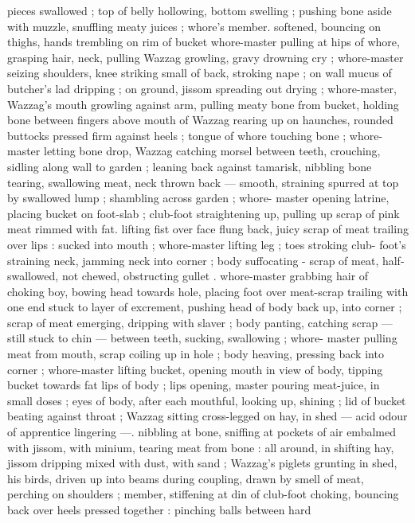 {pieces swallowed ; top of belly hollowing, bottom swelling ; pushing 
bone aside with muzzle, snuffling meaty juices ; whore's member. 
softened, bouncing on thighs, hands trembling on rim of bucket 
whore-master pulling at hips of whore, grasping hair, neck, pulling 
Wazzag growling, gravy drowning cry ; whore-master seizing 
shoulders, knee striking small of back, stroking nape ; on wall 
mucus of butcher's lad dripping ; on ground, jissom spreading out 
drying ; whore-master, Wazzag's mouth growling against arm, pulling 
meaty bone from bucket, holding bone between fingers above mouth 
of Wazzag rearing up on haunches, rounded buttocks pressed firm 
against heels ; tongue of whore touching bone ; whore-master letting 
bone drop, Wazzag catching morsel between teeth, crouching, sidling 
along wall to garden ; leaning back against tamarisk, nibbling bone 
tearing, swallowing meat, neck thrown back --- smooth, straining 
spurred at top by swallowed lump ; shambling across garden ; whore- 
master opening latrine, placing bucket on foot-slab ; club-foot 
straightening up, pulling up scrap of pink meat rimmed with fat. 
lifting fist over face flung back, juicy scrap of meat trailing over lips 
: sucked into mouth ; whore-master lifting leg ; toes stroking club- 
foot's straining neck, jamming neck into corner ; body suffocating - 
scrap of meat, half-swallowed, not chewed, obstructing gullet . 
whore-master grabbing hair of choking boy, bowing head towards 
hole, placing foot over meat-scrap trailing with one end stuck to layer 
of excrement, pushing head of body back up, into corner ; scrap of 
meat emerging, dripping with slaver ; body panting, catching scrap 
--- still stuck to chin --- between teeth, sucking, swallowing ; whore- 
master pulling meat from mouth, scrap coiling up in hole ; body 
heaving, pressing back into corner ; whore-master lifting bucket, 
opening mouth in view of body, tipping bucket towards fat lips of 
body ; lips opening, master pouring meat-juice, in small doses ; eyes 
of body, after each mouthful, looking up, shining ; lid of bucket 
beating against throat ; Wazzag sitting cross-legged on hay, in shed 
--- acid odour of apprentice lingering ---. nibbling at bone, sniffing 
at pockets of air embalmed with jissom, with minium, tearing meat 
from bone : all around, in shifting hay, jissom dripping mixed with 
dust, with sand ; Wazzag's piglets grunting in shed, his birds, driven 
up into beams during coupling, drawn by smell of meat, perching on 
shoulders ; member, stiffening at din of club-foot choking, bouncing 
back over heels pressed together : pinching balls between hard 
}
